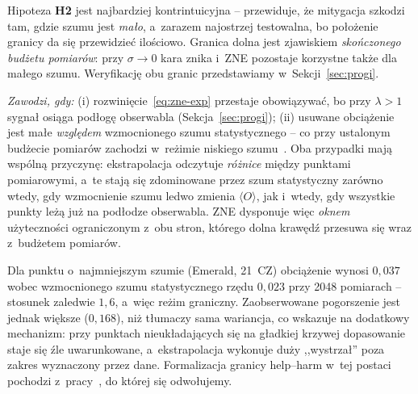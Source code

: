 \documentclass[11pt]{article}
\newcommand{\expv}{\langle O\rangle}
\begin{document}
Hipoteza \textbf{H2} jest najbardziej kontrintuicyjna -- przewiduje, że mitygacja szkodzi tam, gdzie
szumu jest \emph{mało}, a~zarazem najostrzej testowalna, bo położenie granicy da się przewidzieć
ilościowo. Granica dolna jest zjawiskiem \emph{skończonego
budżetu pomiarów}: przy $\sigma \to 0$ kara znika i~ZNE pozostaje korzystne także dla małego szumu.
Weryfikację obu granic przedstawiamy w~Sekcji~\ref{sec:progi}.

\emph{Zawodzi, gdy:} (i) rozwinięcie~\eqref{eq:zne-exp} przestaje obowiązywać, bo przy $\lambda>1$
sygnał osiąga podłogę obserwabla (Sekcja~\ref{sec:progi}); (ii) usuwane obciążenie jest małe
\emph{względem} wzmocnionego szumu statystycznego -- co przy ustalonym budżecie pomiarów zachodzi
w~reżimie niskiego szumu~\cite{alfaro2026}. Oba przypadki mają wspólną przyczynę: ekstrapolacja
odczytuje \emph{różnice} między punktami pomiarowymi, a~te stają się zdominowane przez szum
statystyczny zarówno wtedy, gdy wzmocnienie szumu ledwo zmienia $\expv$, jak i~wtedy, gdy wszystkie
punkty leżą już na podłodze obserwabla. ZNE dysponuje więc \emph{oknem} użyteczności ograniczonym
z~obu stron, którego dolna krawędź przesuwa się wraz z~budżetem pomiarów.

Dla punktu o~najmniejszym szumie (Emerald, 21~CZ) obciążenie wynosi $0{,}037$ wobec
wzmocnionego szumu statystycznego rzędu $0{,}023$ przy 2048 pomiarach -- stosunek zaledwie $1{,}6$,
a~więc reżim graniczny. Zaobserwowane pogorszenie jest jednak większe ($0{,}168$), niż tłumaczy sama
wariancja, co wskazuje na dodatkowy mechanizm: przy punktach nieukładających się na gładkiej krzywej
dopasowanie staje się źle uwarunkowane, a~ekstrapolacja wykonuje duży ,,wystrzał'' poza zakres
wyznaczony przez dane. Formalizacja granicy help--harm w~tej postaci pochodzi
z~pracy~\cite{alfaro2026}, do której się odwołujemy.
\end{document}
